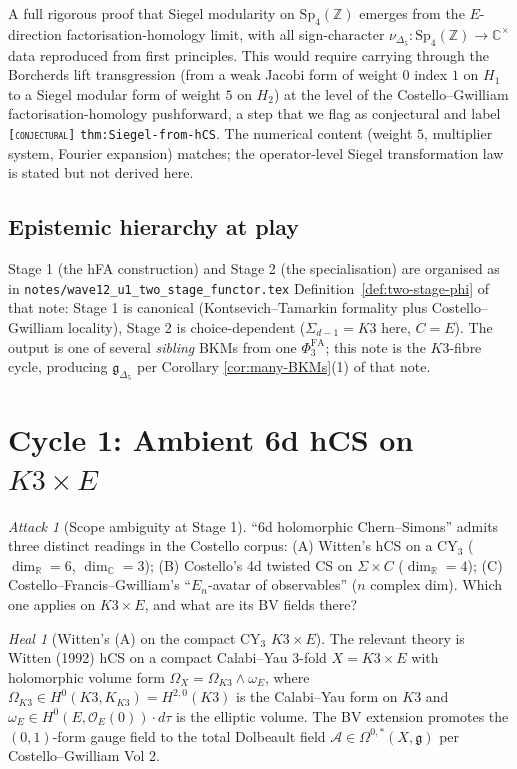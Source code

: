 \documentclass[11pt]{amsart}
\providecommand{\C}{\mathbb{C}}
\providecommand{\R}{\mathbb{R}}
\providecommand{\Z}{\mathbb{Z}}
\providecommand{\cO}{\mathcal{O}}
\providecommand{\cA}{\mathcal{A}}
\providecommand{\g}{\mathfrak{g}}
\providecommand{\Gdelta}{\mathfrak{g}_{\Delta_{5}}}
\providecommand{\PhiFA}{\Phi^{\mathrm{FA}}}
\providecommand{\ClaimStatusConjectured}{\textsc{[conjectural]}}
\theoremstyle{plain}
\theoremstyle{definition}
\theoremstyle{remark}
\newtheorem{attack}[theorem]{Attack}
\newtheorem{heal}[theorem]{Heal}
\begin{document}
A full rigorous proof that Siegel modularity on $\mathrm{Sp}_{4}(\Z)$
emerges from the $E$-direction factorisation-homology limit, with all
sign-character $\nu_{\Delta_{5}}: \mathrm{Sp}_{4}(\Z)\to \C^{\times}$
data reproduced from first principles. This would require carrying
through the Borcherds lift transgression (from a weak Jacobi form of
weight $0$ index $1$ on $H_{1}$ to a Siegel modular form of weight $5$
on $H_{2}$) at the level of the Costello--Gwilliam factorisation-homology
pushforward, a step that we flag as conjectural and label \texttt{\ClaimStatusConjectured}
\texttt{thm:Siegel-from-hCS}. The numerical content (weight $5$, multiplier system,
Fourier expansion) matches; the operator-level Siegel transformation law
is stated but not derived here.

\subsection*{Epistemic hierarchy at play}

Stage 1 (the hFA construction) and Stage 2 (the specialisation) are
organised as in
\texttt{notes/wave12\_u1\_two\_stage\_functor.tex}
Definition~\ref{def:two-stage-phi} of that note: Stage 1 is canonical
(Kontsevich--Tamarkin formality plus Costello--Gwilliam locality),
Stage 2 is choice-dependent ($\Sigma_{d-1} = K3$ here, $C = E$).
The output is one of several \emph{sibling} BKMs from one $\PhiFA_{3}$;
this note is the $K3$-fibre cycle, producing $\Gdelta$ per Corollary
\ref{cor:many-BKMs}(1) of that note.

\section{Cycle 1: Ambient 6d hCS on $K3\times E$}

\begin{attack}[Scope ambiguity at Stage 1]\label{atk:1}
``$6$d holomorphic Chern--Simons'' admits three distinct readings in
the Costello corpus: (A) Witten's hCS on a CY$_{3}$ ($\dim_{\R}=6$,
$\dim_{\C}=3$); (B) Costello's 4d twisted CS on $\Sigma\times C$
($\dim_{\R}=4$); (C) Costello--Francis--Gwilliam's
``$E_{n}$-avatar of observables'' ($n$ complex dim). Which one applies
on $K3\times E$, and what are its BV fields there?
\end{attack}

\begin{heal}[Witten's (A) on the compact CY$_{3}$ $K3\times E$]\label{heal:1}
The relevant theory is Witten (1992) hCS on a compact Calabi--Yau
3-fold $X = K3\times E$ with holomorphic volume form
$\Omega_{X} = \Omega_{K3}\wedge \omega_{E}$, where $\Omega_{K3}\in
H^{0}(K3, K_{K3}) = H^{2,0}(K3)$ is the Calabi--Yau form on $K3$ and
$\omega_{E}\in H^{0}(E, \cO_{E}(0))\cdot d\tau$ is the elliptic volume.
The BV extension promotes the $(0,1)$-form gauge field to the total
Dolbeault field $\cA \in \Omega^{0,\ast}(X, \g)$ per
Costello--Gwilliam Vol 2.
\end{heal}
\end{document}
